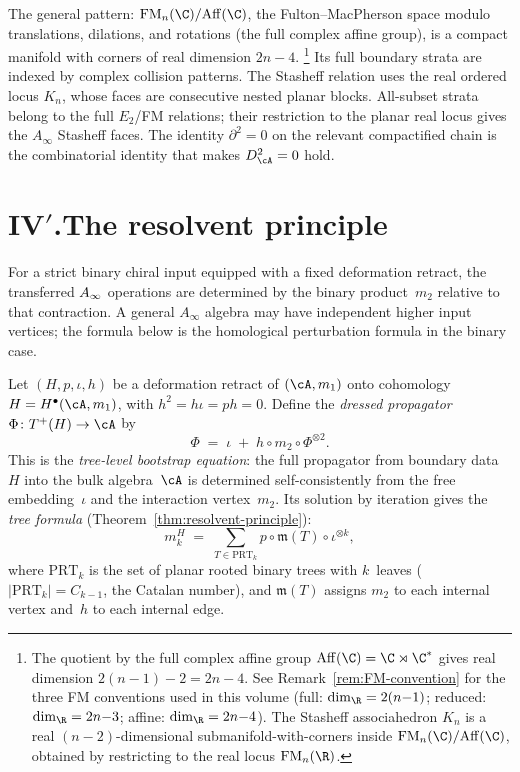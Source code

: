 The general pattern: $\FM_n(\C)/\mathrm{Aff}(\C)$, the Fulton--MacPherson
space modulo translations, dilations, and rotations (the full complex
affine group), is a compact manifold with corners of real
dimension $2n - 4$.%
\footnote{The quotient by the full complex affine group
$\mathrm{Aff}(\C) = \C \rtimes \C^*$ gives real dimension
$2(n{-}1) - 2 = 2n{-}4$. See Remark~\ref{rem:FM-convention}
for the three FM conventions used in this volume
(full: $\dim_\R = 2(n{-}1)$; reduced: $\dim_\R = 2n{-}3$;
affine: $\dim_\R = 2n{-}4$).
The Stasheff associahedron $K_n$ is a real $(n{-}2)$-dimensional
submanifold-with-corners inside $\FM_n(\C)/\mathrm{Aff}(\C)$,
obtained by restricting to the real locus $\FM_n(\R)$.}
Its full boundary strata are indexed by complex collision patterns.
The Stasheff relation uses the real ordered locus $K_n$, whose faces
are consecutive nested planar blocks.  All-subset strata belong to the
full $E_2$/FM relations; their restriction to the planar real locus
gives the $A_\infty$ Stasheff faces.  The identity
$\partial^2 = 0$ on the relevant compactified chain is the
combinatorial identity that makes $D_\cA^2 = 0$ hold.


\section*{IV$'$.\quad The resolvent principle}

For a strict binary chiral input equipped with a fixed deformation
retract, the transferred $A_\infty$ operations are determined by the
binary product~$m_2$ relative to that contraction.  A general
$A_\infty$ algebra may have independent higher input vertices; the
formula below is the homological perturbation formula in the binary
case.

Let $(H, p, \iota, h)$ be a deformation retract of $(\cA, m_1)$
onto cohomology $H = H^\bullet(\cA, m_1)$, with $h^2 = h\iota =
ph = 0$. Define the \emph{dressed propagator}
$\Phi \colon T^+(H) \to \cA$ by
\[
\Phi \;=\; \iota \;+\; h \circ m_2 \circ \Phi^{\otimes 2}.
\]
This is the \emph{tree-level bootstrap equation}: the full
propagator from boundary data~$H$ into the bulk algebra~$\cA$ is
determined self-consistently from the free embedding~$\iota$ and
the interaction vertex~$m_2$. Its solution by iteration gives the
\emph{tree formula}
(Theorem~\ref{thm:resolvent-principle}):
\[
m_k^H
\;=\;
\sum_{T \in \mathrm{PRT}_k}
p \circ \mathfrak{m}(T) \circ \iota^{\otimes k},
\]
where $\mathrm{PRT}_k$ is the set of planar rooted binary trees
with $k$~leaves ($|\mathrm{PRT}_k| = C_{k-1}$, the Catalan
number), and $\mathfrak{m}(T)$ assigns $m_2$ to each internal
vertex and~$h$ to each internal edge.

